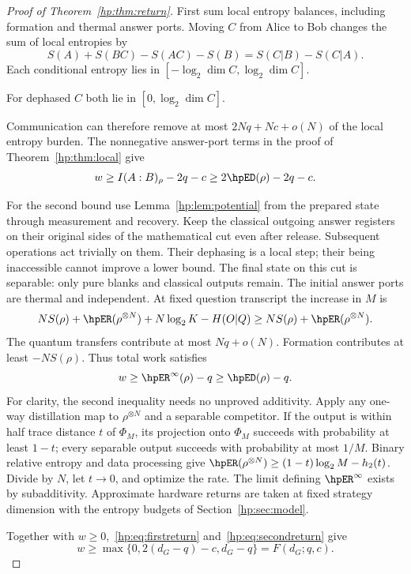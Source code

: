 \begin{proof}[Proof of Theorem~\ref{hp:thm:return}]
First sum local entropy balances, including formation and thermal answer ports. Moving $C$ from Alice to Bob changes the sum of local entropies by
\[
 S(A)+S(BC)-S(AC)-S(B)=S(C|B)-S(C|A).
\]
Each conditional entropy lies in $[-\log_2\dim C,\log_2\dim C]$.

For dephased $C$ both lie in $[0,\log_2\dim C]$.

Communication can therefore remove at most $2Nq+Nc+o(N)$ of the local entropy burden. The nonnegative answer-port terms in the proof of Theorem~\ref{hp:thm:local} give
\begin{equation}
 w\ge I(A:B)_\rho-2q-c\ge2\hpED(\rho)-2q-c.\label{hp:eq:firstreturn}
\end{equation}

For the second bound use Lemma~\ref{hp:lem:potential} from the prepared state through measurement and recovery. Keep the classical outgoing answer registers on their original sides of the mathematical cut even after release. Subsequent operations act trivially on them. Their dephasing is a local step; their being inaccessible cannot improve a lower bound. The final state on this cut is separable: only pure blanks and classical outputs remain. The initial answer ports are thermal and independent. At fixed question transcript the increase in $M$ is
\[
 NS(\rho)+\hpER(\rho^{\otimes N})
      +N\log_2K-H(O|Q)
 \ge NS(\rho)+\hpER(\rho^{\otimes N}).
\]
The quantum transfers contribute at most $Nq+o(N)$. Formation contributes at least $-NS(\rho)$. Thus total work satisfies
\begin{equation}
 w\ge\hpER^\infty(\rho)-q\ge\hpED(\rho)-q.\label{hp:eq:secondreturn}
\end{equation}
For clarity, the second inequality needs no unproved additivity. Apply any one-way distillation map to $\rho^{\otimes N}$ and a separable competitor. If the output is within half trace distance $t$ of $\Phi_M$, its projection onto $\Phi_M$ succeeds with probability at least $1-t$; every separable output succeeds with probability at most $1/M$. Binary relative entropy and data processing give $\hpER(\rho^{\otimes N})\ge(1-t)\log_2M-h_2(t)$. Divide by $N$, let $t\to0$, and optimize the rate. The limit defining $\hpER^\infty$ exists by subadditivity. Approximate hardware returns are taken at fixed strategy dimension with the entropy budgets of Section~\ref{hp:sec:model}.

Together with $w\ge0$,~\eqref{hp:eq:firstreturn} and~\eqref{hp:eq:secondreturn} give
\[
 w\ge\max\{0,2(d_G-q)-c,d_G-q\}=F(d_G;q,c).
\]


\end{proof}
